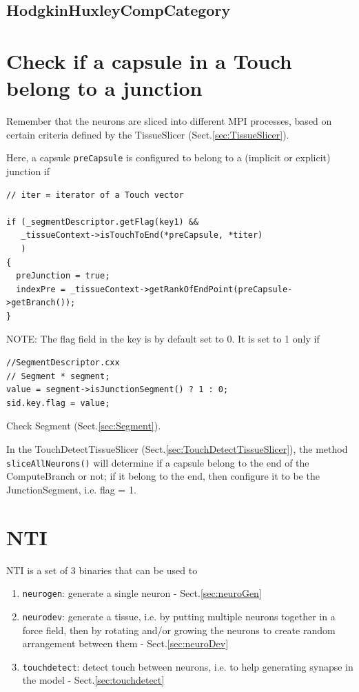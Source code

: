 \subsection{HodgkinHuxleyCompCategory}






\section{Check if a capsule in a Touch belong to a junction}

Remember that the neurons are sliced into different MPI processes, based on
certain criteria defined by the TissueSlicer (Sect.\ref{sec:TissueSlicer}).


Here, a capsule \verb!preCapsule! is configured to belong to a (implicit or
explicit) junction if
\begin{verbatim}
// iter = iterator of a Touch vector

if (_segmentDescriptor.getFlag(key1) &&
   _tissueContext->isTouchToEnd(*preCapsule, *titer)
   )
{
  preJunction = true;
  indexPre = _tissueContext->getRankOfEndPoint(preCapsule->getBranch());
}
\end{verbatim}

NOTE: The flag field in the key is by default set to 0. It is set to 1 only if 
\begin{verbatim}
//SegmentDescriptor.cxx
// Segment * segment;
value = segment->isJunctionSegment() ? 1 : 0;
sid.key.flag = value;
\end{verbatim}
Check Segment (Sect.\ref{sec:Segment}).

In the TouchDetectTissueSlicer (Sect.\ref{sec:TouchDetectTissueSlicer}), the
method \verb!sliceAllNeurons()! will determine if a capsule belong to the end of
the ComputeBranch or not; if it belong to the end, then configure it to be the
JunctionSegment, i.e. flag = 1.


\section{NTI}
\label{sec:NTI}

NTI is a set of 3 binaries that can be used to 
\begin{enumerate}
  \item \verb!neurogen!: generate a single neuron - Sect.\ref{sec:neuroGen}
  
  \item \verb!neurodev!: generate a tissue, i.e. by putting multiple
  neurons together in a force field, then by rotating and/or growing the neurons
  to create random arrangement between them - Sect.\ref{sec:neuroDev}
  
  \item \verb!touchdetect!: detect touch between neurons, i.e. to help
  generating synapse in the model - Sect.\ref{sec:touchdetect}
\end{enumerate}

